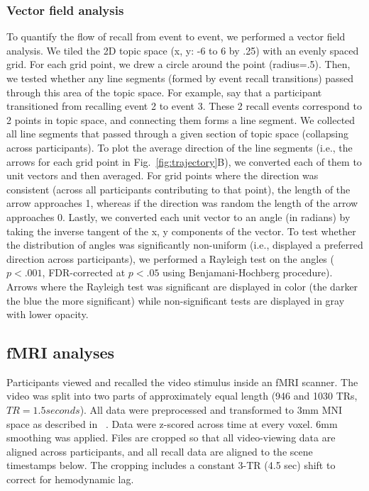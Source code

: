 \documentclass{article}
\begin{document}
\subsubsection*{Vector field analysis}
To quantify the flow of recall from event to event, we performed a vector field analysis.  We tiled the 2D topic space (x, y: -6 to 6 by .25) with an evenly spaced grid. For each grid point, we drew a circle around the point (radius=.5). Then, we tested whether any line segments (formed by event recall transitions) passed through this area of the topic space.  For example, say that a participant transitioned from recalling event 2 to event 3. These 2 recall events correspond to 2 points in topic space, and connecting them forms a line segment. We collected all line segments that passed through a given section of topic space (collapsing across participants). To plot the average direction of the line segments (i.e., the arrows for each grid point in Fig.~\ref{fig:trajectory}B), we converted each of them to unit vectors and then averaged. For grid points where the direction was consistent (across all participants contributing to that point), the length of the arrow approaches 1, whereas if the direction was random the length of the arrow approaches 0. Lastly, we converted each unit vector to an angle (in radians) by taking the inverse tangent of the x, y components of the vector. To test whether the distribution of angles was significantly non-uniform (i.e., displayed a preferred direction across participants), we performed a Rayleigh test on the angles ($p<.001$, FDR-corrected at $p<.05$ using Benjamani-Hochberg procedure). Arrows where the Rayleigh test was significant are displayed in color (the darker the blue the more significant) while non-significant tests are displayed in gray with lower opacity.

\subsection*{fMRI analyses}
Participants viewed and recalled the video stimulus inside an fMRI scanner. The video was split into two parts of approximately equal length (946 and 1030 TRs, $TR=1.5 seconds$). All data were preprocessed and transformed to 3mm MNI space as described in ~\citep{ChenEtal17}. Data were z-scored across time at every voxel. 6mm smoothing was applied.
Files are cropped so that all video-viewing data are aligned across participants, and all recall data are aligned to the scene timestamps below. The cropping includes a constant 3-TR (4.5 sec) shift to correct for hemodynamic lag.
\end{document}

